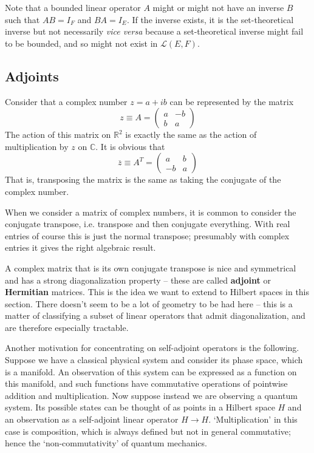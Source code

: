 \documentclass[oneside,english]{amsbook}
\numberwithin{section}{chapter}
\theoremstyle{plain}
\theoremstyle{definition}
\begin{document}
Note that a bounded linear operator $A$ might or might not have an inverse $B$ such that $AB = I_F$ and $BA = I_E$. If the inverse exists, it is the set-theoretical inverse but not necessarily \emph{vice versa} because a set-theoretical inverse might fail to be bounded, and so might not exist in $\mathscr{L}(E, F)$.

\subsection{Adjoints}

Consider that a complex number $z = a + ib$ can be represented by the matrix
\[
	z \equiv A = \begin{pmatrix} a & -b \\ b & a \end{pmatrix}
\]
The action of this matrix on $\mathbb{R}^2$ is exactly the same as the action of multiplication by $z$ on $\mathbb{C}$. It is obvious that
\[
\overline{z} \equiv A^T = \begin{pmatrix} a & b \\ -b & a \end{pmatrix}
\]
That is, transposing the matrix is the same as taking the conjugate of the complex number.

When we consider a matrix of complex numbers, it is common to consider the conjugate transpose, i.e. transpose and then conjugate everything. With real entries of course this is just the normal transpose; presumably with complex entries it gives the right algebraic result. 

A complex matrix that is its own conjugate transpose is nice and symmetrical and has a strong diagonalization property -- these are called \textbf{adjoint} or \textbf{Hermitian} matrices. This is the idea we want to extend to Hilbert spaces in this section. There doesn't seem to be a lot of geometry to be had here -- this is a matter of classifying a subset of linear operators that admit diagonalization, and are therefore especially tractable.

Another motivation for concentrating on self-adjoint operators is the following. Suppose we have a classical physical system and consider its phase space, which is a manifold. An observation of this system can be expressed as a function on this manifold, and such functions have commutative operations of pointwise addition and multiplication. Now suppose instead we are observing a quantum system. Its possible states can be thought of as points in a Hilbert space $H$ and an observation as a self-adjoint linear operator $H\to H$. `Multiplication' in this case is composition, which is always defined but not in general commutative; hence the `non-commutativity' of quantum mechanics.
\end{document}
